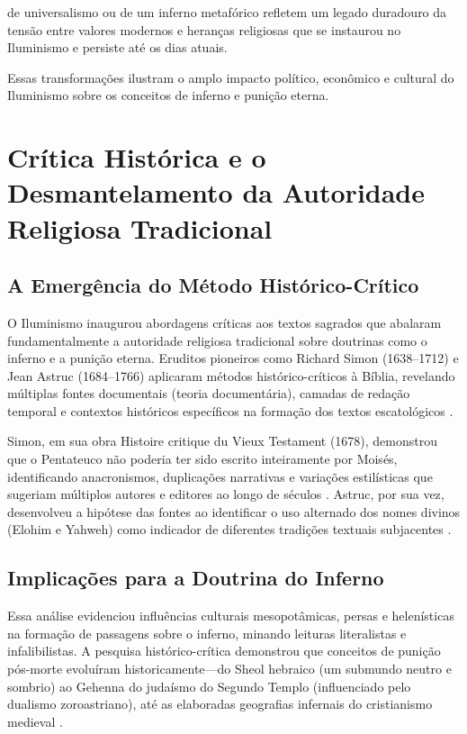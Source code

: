 de universalismo ou de um inferno metafórico refletem um legado duradouro da tensão entre valores modernos e heranças religiosas que se instaurou no Iluminismo e persiste até os dias atuais.

Essas transformações ilustram o amplo impacto político, econômico e cultural do Iluminismo sobre os conceitos de inferno e punição eterna.

\section{Crítica Histórica e o Desmantelamento da Autoridade Religiosa Tradicional}

\subsection{A Emergência do Método Histórico-Crítico}

O Iluminismo inaugurou abordagens críticas aos textos sagrados que abalaram fundamentalmente a autoridade religiosa tradicional sobre doutrinas como o inferno e a punição eterna. Eruditos pioneiros como Richard Simon (1638--1712) e Jean Astruc (1684--1766) aplicaram métodos histórico-críticos à Bíblia, revelando múltiplas fontes documentais (teoria documentária), camadas de redação temporal e contextos históricos específicos na formação dos textos escatológicos \cite{Legaspi2010}.

Simon, em sua obra Histoire critique du Vieux Testament (1678), demonstrou que o Pentateuco não poderia ter sido escrito inteiramente por Moisés, identificando anacronismos, duplicações narrativas e variações estilísticas que sugeriam múltiplos autores e editores ao longo de séculos \cite{Simon1678}. Astruc, por sua vez, desenvolveu a hipótese das fontes ao identificar o uso alternado dos nomes divinos (Elohim e Yahweh) como indicador de diferentes tradições textuais subjacentes \cite{Astruc1753}.

\subsection{Implicações para a Doutrina do Inferno}

Essa análise evidenciou influências culturais mesopotâmicas, persas e helenísticas na formação de passagens sobre o inferno, minando leituras literalistas e infalibilistas. A pesquisa histórico-crítica demonstrou que conceitos de punição pós-morte evoluíram historicamente---do Sheol hebraico (um submundo neutro e sombrio) ao Gehenna do judaísmo do Segundo Templo (influenciado pelo dualismo zoroastriano), até as elaboradas geografias infernais do cristianismo medieval \cite{Bernstein1993}.

